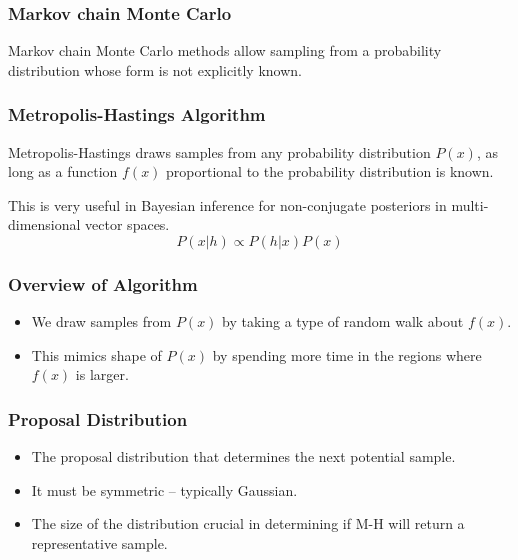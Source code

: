 \begin{frame}
  \frametitle{Markov chain Monte Carlo}
  Markov chain Monte Carlo methods allow sampling from a
  probability distribution whose form is not explicitly known.
\end{frame}

\begin{frame}
  \frametitle{Metropolis-Hastings Algorithm}
  \begin{center}
    Metropolis-Hastings draws samples from any probability distribution $P(x)$, as long as a
    function $f(x)$ proportional to the probability distribution is known.
    \vspace{4em}

    This is very useful in Bayesian inference for non-conjugate posteriors
    in multi-dimensional vector spaces.
    \[P(x|h) \propto P(h|x) P(x)\]
  \end{center}
\end{frame}

\begin{frame}
  \frametitle{Overview of Algorithm}
  \begin{itemize}
  \item We draw samples from $P(x)$ by taking a type of random walk about $f(x)$.
  \item This mimics shape of $P(x)$ by spending more time in the regions where $f(x)$ is larger.
  \end{itemize}
\end{frame}

\begin{frame}
  \frametitle{Proposal Distribution}
  \begin{itemize}
  \item The proposal distribution that determines the next potential sample.
  \item It must be symmetric -- typically Gaussian.
  \item The size of the distribution crucial in determining if M-H will return a representative sample.
  \end{itemize}
\end{frame}

\begin{frame}
  \frametitle{}
\end{frame}
